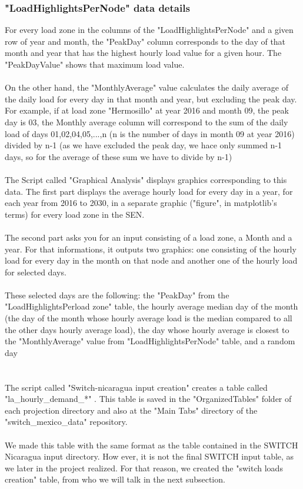 \documentclass{article}
\begin{document}
\subsubsection{"LoadHighlightsPerNode" data details}
For every load zone in the columns of the "LoadHighlightsPerNode" and a given row of year and month, the "PeakDay" column corresponds to the day of that month and year that has the highest hourly load value for a given hour. The "PeakDayValue" shows that maximum load value.
\\
\\On the other hand, the "MonthlyAverage" value calculates the daily average of the daily load for every day in that month and year, but excluding the peak day. For example, if at load zone "Hermosillo" at year 2016 and month 09, the peak day is 03, the Monthly average column will correspond to the sum of the daily load of days 01,02,04,05,...,n (n is the number of days in month 09 at year 2016) divided by n-1 (as we have excluded the peak day, we hace only summed n-1 days, so for the average of these sum we have to divide by n-1)
\\
\\
The Script called "Graphical Analysis" displays graphics corresponding to this data. The first part displays the average hourly load for every day in a year, for each year from 2016 to 2030, in a separate graphic ("figure", in matplotlib's terms) for every load zone in the SEN.
\\
\\The second part asks you for an input consisting of a load zone, a Month and a year. For that informations, it outputs two graphics: one consisting of the hourly load for every day in the month on that node	 and another one of the hourly load for selected days. 
\\
\\These selected days are the following: the "PeakDay" from the "LoadHighlightsPerload zone" table, the hourly average median day of the month (the day of the month whose hourly average load is the median compared to all the other days hourly average load), the day whose hourly average is closest to the "MonthlyAverage" value from "LoadHighlightsPerNode" table, and a random day
\\
\\
\\The script called "Switch-nicaragua input creation" creates a table called "la\_hourly\_demand\_*" . This table is saved in the "OrganizedTables" folder of each projection directory and also at the "Main Tabs" directory of the "switch\_mexico\_data" repository. 
\\
\\ We made this table with the same format as the table contained in   the SWITCH Nicaragua input directory. How ever, it is not the final SWITCH input table, as we later in the project realized. For that reason, we created the "switch loads creation" table, from who we will talk in the next subsection.
\end{document}
